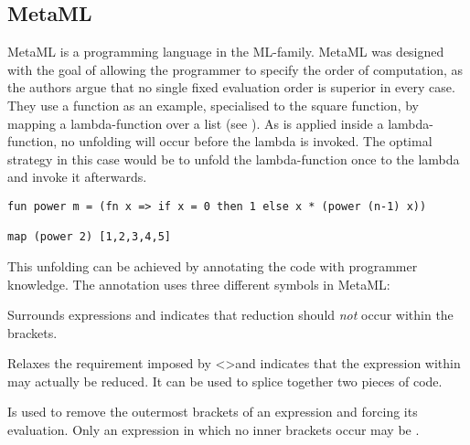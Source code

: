 \subsection{MetaML}
MetaML is a programming language in the ML-family. MetaML was designed with the goal of allowing the programmer to specify the order of computation, as the authors argue that no single fixed evaluation order is superior in every case. They use a  function as an example, specialised to the square function, by mapping a lambda-function over a list (see ). As  is applied inside a lambda-function, no unfolding will occur before the lambda is invoked. The optimal strategy in this case would be to unfold the lambda-function once to the lambda  and invoke it afterwards.
\begin{lstlisting}[label={lst:metaml:example}, caption={MetaML squaring a list with a power-function}]
fun power m = (fn x => if x = 0 then 1 else x * (power (n-1) x))

map (power 2) [1,2,3,4,5]
\end{lstlisting}

This unfolding can be achieved by annotating the code with programmer knowledge. The annotation uses three different symbols in MetaML:
\begin{labeling}{\quad\quad}
    \item[\ttt{\textless\textgreater}] Surrounds expressions and indicates that reduction should \textit{not} occur within the brackets.
    \item[\ttt{\textasciitilde}] Relaxes the requirement imposed by \textless\textgreater and indicates that the expression within may actually be reduced. It can be used to splice together two pieces of code.
    \item[\ttt{run}] Is used to remove the outermost brackets of an expression and forcing its evaluation. Only an expression in which no inner brackets occur may be .
\end{labeling}

